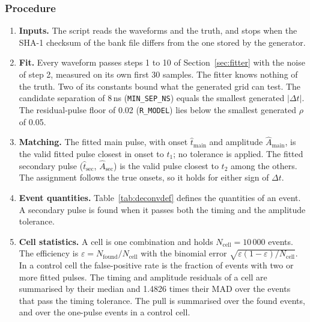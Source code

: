 \documentclass[11pt]{article}
\newcommand{\code}[1]{\texttt{#1}}
\begin{document}
\subsubsection{Procedure}

\begin{enumerate}
\item \textbf{Inputs.} The script reads the waveforms and the truth, and stops when the SHA-1 checksum of the bank file differs from the one stored by the generator.
\item \textbf{Fit.} Every waveform passes steps 1 to 10 of Section~\ref{sec:fitter} with the noise of step 2, measured on its own first 30 samples. The fitter knows nothing of the truth. Two of its constants bound what the generated grid can test. The candidate separation of 8\,ns (\code{MIN\_SEP\_NS}) equals the smallest generated $|\Delta t|$. The residual-pulse floor of 0.02 (\code{R\_MODEL}) lies below the smallest generated $\rho$ of 0.05.
\item \textbf{Matching.} The fitted main pulse, with onset $\hat t_{\mathrm{main}}$ and amplitude $\hat A_{\mathrm{main}}$, is the valid fitted pulse closest in onset to $t_1$; no tolerance is applied. The fitted secondary pulse ($\hat t_{\mathrm{sec}}$, $\hat A_{\mathrm{sec}}$) is the valid pulse closest to $t_2$ among the others. The assignment follows the true onsets, so it holds for either sign of $\Delta t$.
\item \textbf{Event quantities.} Table~\ref{tab:deconvdef} defines the quantities of an event. A secondary pulse is found when it passes both the timing and the amplitude tolerance.
\item \textbf{Cell statistics.} A cell is one combination and holds $N_{\mathrm{cell}} = 10\,000$ events. The efficiency is $\varepsilon = N_{\mathrm{found}}/N_{\mathrm{cell}}$ with the binomial error $\sqrt{\varepsilon (1 - \varepsilon)/N_{\mathrm{cell}}}$. In a control cell the false-positive rate is the fraction of events with two or more fitted pulses. The timing and amplitude residuals of a cell are summarised by their median and 1.4826 times their MAD over the events that pass the timing tolerance. The pull is summarised over the found events, and over the one-pulse events in a control cell.
\end{enumerate}
\end{document}
